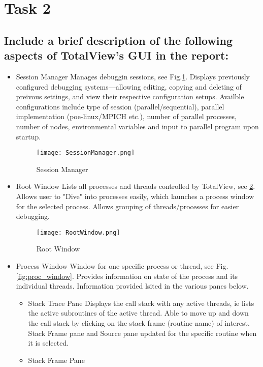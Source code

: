 \documentclass{article}
\begin{document}
\section{Task 2}

\subsection{Include a brief description of the following aspects of TotalView’s GUI in the report:}
\begin{itemize}
	\item Session Manager
	Manages debuggin sessions, see Fig.\ref{fig:sess_manager}. Displays previously configured debugging systems---allowing editing, copying and deleting of preivous settings, and view their respective configuration setups. Availble configurations include type of session (parallel/sequential), parallel implementation (poe-linux/MPICH etc.), number of parallel processes, number of nodes, environmental variables and input to parallel program upon startup.
	\begin{figure}[p] %
			\texttt{[image: SessionManager.png]}
		\caption{Session Manager}
		\label{fig:sess_manager}
	\end{figure}
	\item Root Window
	Lists all processes and threads controlled by TotalView, see \ref{fig:root_window}. Allows user to "Dive" into processes easily, which launches a process window for the selected process. Allows grouping of threads/processes for easier debugging.
		\begin{figure}[p] %
			\texttt{[image: RootWindow.png]}
		\caption{Root Window}
		\label{fig:root_window}
	\end{figure}
	\item Process Window
	Window for one specific process or thread, see Fig. \ref{fig:proc_window}. Provides information on state of the process and its individual threads. Information provided lsited in the various panes below.
	\begin{itemize}
		\item Stack Trace Pane
		Displays the call stack with any active threads, ie lists the active subroutines of the active thread. Able to move up and down the call stack by clicking on the stack frame (routine name) of interest. Stack Frame pane and Source pane updated for the specific routine when it is selected.
		\item Stack Frame Pane

\end{itemize}
\end{itemize}
\end{document}
